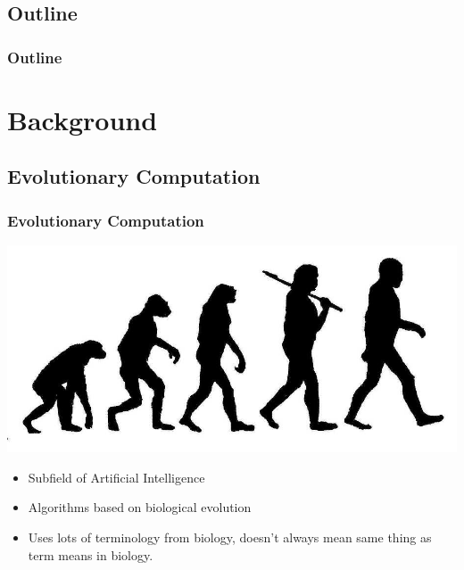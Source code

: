 \documentclass{beamer}
\begin{document}
\subsection*{Outline}

\begin{frame}
	\frametitle{Outline}
	\tableofcontents[hideallsubsections]
\end{frame}

\section[Background]{Background}

\subsection{Evolutionary Computation}

\begin{frame}
	\frametitle{Evolutionary Computation}
	\centering
	\includegraphics[width=.6\textwidth]{Illustrations/evolution.jpg}
	\\
	\large
	\begin{itemize}
		\item Subfield of Artificial Intelligence
		\pause
		\item Algorithms based on biological evolution
		\pause
		\item Uses lots of terminology from biology, doesn't always mean same thing as term means in biology.
	\end{itemize}
\end{frame}
\end{document}
